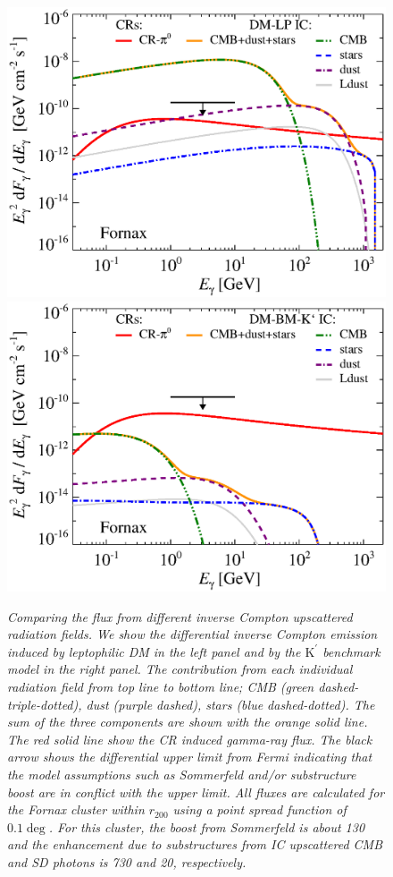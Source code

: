 \documentclass[10pt,aps,pra,reprint,amsmath,amsfonts,amssymb,showpacs,nofootinbib,floatfix]{revtex4-1}
\def\del#1{{}}
\newcommand{\rmn}{\mathrm}
\newcommand{\Kp}{\rmn{K}^\prime}
\newcommand{\rvir}{r_{200}}
\begin{document}
\begin{figure}
\begin{minipage}{2.0\columnwidth}
\includegraphics[width=0.49\columnwidth]{figures/flux.IRcomp.v12.0.1deg.1.6T.SubMass.elmu.SF300.noMW.woGal.eps}
\includegraphics[width=0.49\columnwidth]{figures/flux.IRcomp.BMv12.0.1deg.SubMass.noMW.woGal.eps}
\caption{\it Comparing the flux from different inverse Compton
  upscattered radiation fields. We show the differential inverse
  Compton emission induced by leptophilic DM in the left panel and by
  the $\Kp$ benchmark model in the right panel. The contribution from
  each individual radiation field from top line to bottom line; CMB
  (green dashed-triple-dotted), dust (purple dashed), stars (blue
  dashed-dotted). The sum of the three components are shown with the
  orange solid line.  The red solid line show the CR induced gamma-ray
  flux. The black arrow shows the differential upper limit from Fermi
  \protect \cite{2010ApJ...717L..71A} indicating that the model
  assumptions such as Sommerfeld and/or substructure boost are in
  conflict with the upper limit. \del{We also show projected CTA point
  source sensitivities ($5\sigma$, 50h).}  All fluxes are calculated
  for the Fornax cluster within $\rvir$ using a point spread function
  of $0.1\deg$. For this cluster, the boost from Sommerfeld is about
  130 and the enhancement due to substructures from IC upscattered CMB
  and SD photons is 730 and 20, respectively.}
 \label{fig:IR_comp}
\end{minipage}
\end{figure}
\end{document}
